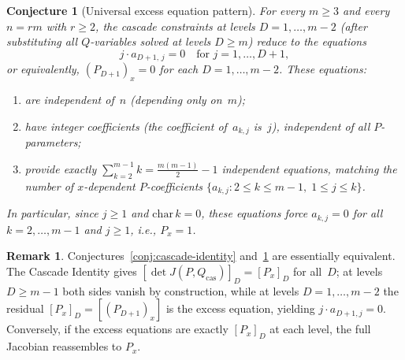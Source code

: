\documentclass[12pt,a4paper]{article}
\newtheorem{conjecture}[theorem]{Conjecture}
\theoremstyle{definition}
\newtheorem{remark}[theorem]{Remark}
\newcommand{\kk}{k}
\begin{document}
\begin{conjecture}[Universal excess equation pattern]%
\label{conj:universal-excess}
For every $m \geq 3$ and every $n = rm$ with $r \geq 2$,
the cascade constraints at levels $D = 1, \ldots, m-2$
(after substituting all $Q$-variables solved at levels $D \geq m$)
reduce to the equations
\[
  j \cdot a_{D+1,\,j} = 0 \quad
  \text{for } j = 1, \ldots, D+1,
\]
or equivalently, $(P_{D+1})_x = 0$ for each $D = 1, \ldots, m-2$.
These equations:
\begin{enumerate}
\item[\textup{(a)}] are independent of~$n$
  \textup{(}depending only on~$m$\textup{)};
\item[\textup{(b)}] have integer coefficients
  \textup{(}the coefficient of~$a_{k,j}$ is~$j$\textup{)},
  independent of all $P$-parameters;
\item[\textup{(c)}] provide exactly
  $\sum_{k=2}^{m-1} k = \tfrac{m(m-1)}{2} - 1$
  independent equations, matching the number of $x$-dependent
  $P$-coefficients
  $\{a_{k,j} : 2 \leq k \leq m-1,\; 1 \leq j \leq k\}$.
\end{enumerate}
In particular, since $j \geq 1$ and $\mathrm{char}\,\kk = 0$,
these equations force $a_{k,j} = 0$ for all
$k = 2, \ldots, m-1$ and $j \geq 1$, i.e., $P_x = 1$.
\end{conjecture}

\begin{remark}
Conjectures~\ref{conj:cascade-identity}
and~\ref{conj:universal-excess} are essentially equivalent.
The Cascade Identity gives
$[\det J(P, Q_{\mathrm{cas}})]_D = [P_x]_D$ for all~$D$;
at levels $D \geq m-1$ both sides vanish by construction,
while at levels $D = 1, \ldots, m-2$ the residual
$[P_x]_D = [(P_{D+1})_x]$ is the excess equation, yielding
$j \cdot a_{D+1,j} = 0$. Conversely, if the excess equations
are exactly $[P_x]_D$ at each level, the full Jacobian reassembles
to $P_x$.
\end{remark}
\end{document}
